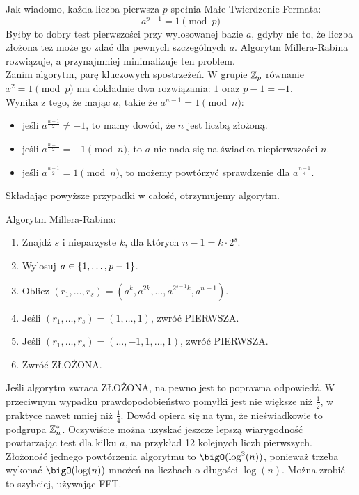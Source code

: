 Jak wiadomo, każda liczba pierwsza \( p \) spełnia Małe Twierdzenie Fermata: \[ a^{p-1} = 1 \pmod{p} \] Byłby to dobry test pierwszości przy wylosowanej bazie \( a \), gdyby nie to, że liczba złożona też może go zdać dla pewnych szczególnych \( a \). Algorytm Millera-Rabina rozwiązuje, a przynajmniej minimalizuje ten problem. \\
Zanim algorytm, parę kluczowych spostrzeżeń. W grupie \( \mathbb{Z}_p \) równanie \( x^2 = 1 \pmod{p} \) ma dokładnie dwa rozwiązania: \( 1 \) oraz \( p - 1 = -1 \). \\
Wynika z tego, że mając \( a \), takie że \( a^{n-1} = 1 \pmod{n} \):
\begin{itemize}
    \item jeśli \( a^{\frac{n-1}{2}} \neq \pm 1 \), to mamy dowód, że \( n \) jest liczbą złożoną.
    \item jeśli \( a^{\frac{n-1}{2}} = -1 \pmod{n} \), to \( a \) nie nada się na świadka niepierwszości \( n \).
    \item jeśli \( a^{\frac{n-1}{2}} = 1 \pmod{n} \), to możemy powtórzyć sprawdzenie dla \( a^{\frac{n-1}{4}}\).
\end{itemize}
Składając powyższe przypadki w całość, otrzymujemy algorytm.
\begin{greyframe}
    Algorytm Millera-Rabina:
    \begin{enumerate}
        \item Znajdź \( s \) i nieparzyste \( k \), dla których \( n-1 = k \cdot 2^s \).
        \item Wylosuj \( a \in \set{1, \dots, p - 1} \).
        \item Oblicz \( (r_1, \dots, r_s ) = (a^k, a^{2k}, \dots, a^{2^{s-1}k}, a^{n-1}) \).
        \item Jeśli \( (r_1, \dots, r_s) = (1, \dots, 1) \), zwróć PIERWSZA.
        \item Jeśli \( (r_1, \dots, r_s) = (\dots, -1, 1, \dots, 1) \), zwróć PIERWSZA.
        \item Zwróć ZŁOŻONA.
    \end{enumerate}
\end{greyframe}
Jeśli algorytm zwraca ZŁOŻONA, na pewno jest to poprawna odpowiedź. W przeciwnym wypadku prawdopodobieństwo pomyłki jest nie większe niż \( \frac{1}{2} \), w praktyce nawet mniej niż \( \frac{1}{4} \).
Dowód opiera się na tym, że nieświadkowie to podgrupa \( \mathbb{Z}^{*}_n \). Oczywiście można uzyskać jeszcze lepszą wiarygodność powtarzając test dla kilku \( a \), na przykład 12 kolejnych liczb pierwszych. \\
Złożoność jednego powtórzenia algorytmu to \( \bigO(\log^3(n)) \), ponieważ trzeba wykonać \( \bigO(\log(n)) \) mnożeń na liczbach o długości \( \log(n) \). Można zrobić to szybciej, używając FFT.